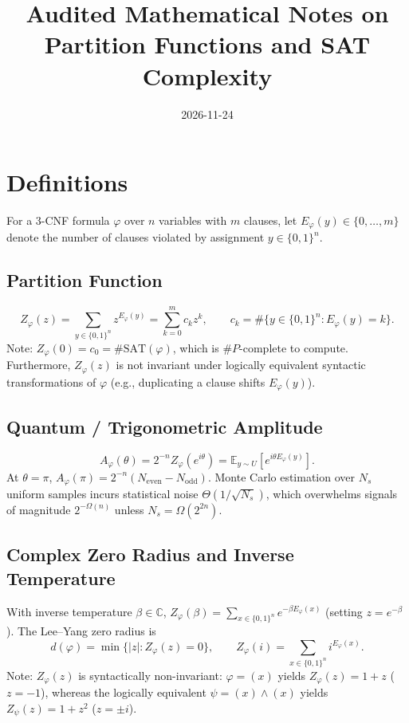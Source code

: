 \documentclass[11pt]{article}
\title{Audited Mathematical Notes on Partition Functions and SAT Complexity}
\date{2026-11-24}
\begin{document}
\maketitle

\section{Definitions}
For a 3-CNF formula $\varphi$ over $n$ variables with $m$ clauses, let $E_\varphi(y) \in \{0,\dots,m\}$ denote the number of clauses violated by assignment $y \in \{0,1\}^n$.

\subsection{Partition Function}
\begin{equation}
Z_\varphi(z) = \sum_{y \in \{0,1\}^n} z^{E_\varphi(y)} = \sum_{k=0}^{m} c_k z^k, \qquad c_k = \#\{y \in \{0,1\}^n : E_\varphi(y) = k\}.
\end{equation}
Note: $Z_\varphi(0) = c_0 = \#\mathrm{SAT}(\varphi)$, which is $\#P$-complete to compute. Furthermore, $Z_\varphi(z)$ is not invariant under logically equivalent syntactic transformations of $\varphi$ (e.g., duplicating a clause shifts $E_\varphi(y)$).

\subsection{Quantum / Trigonometric Amplitude}
\begin{equation}
A_\varphi(\theta) = 2^{-n} Z_\varphi(e^{i\theta}) = \mathbb{E}_{y \sim U}\!\left[e^{i\theta E_\varphi(y)}\right].
\end{equation}
At $\theta = \pi$, $A_\varphi(\pi) = 2^{-n}(N_{\mathrm{even}} - N_{\mathrm{odd}})$. Monte Carlo estimation over $N_s$ uniform samples incurs statistical noise $\Theta(1/\sqrt{N_s})$, which overwhelms signals of magnitude $2^{-\Omega(n)}$ unless $N_s = \Omega(2^{2n})$.

\subsection{Complex Zero Radius and Inverse Temperature}
With inverse temperature $\beta \in \mathbb{C}$, $Z_\varphi(\beta) = \sum_{x \in \{0,1\}^n} e^{-\beta E_\varphi(x)}$ (setting $z = e^{-\beta}$). The Lee--Yang zero radius is
\begin{equation}
d(\varphi) = \min \{ |z| : Z_\varphi(z) = 0 \}, \qquad Z_\varphi(i) = \sum_{x \in \{0,1\}^n} i^{E_\varphi(x)}.
\end{equation}
Note: $Z_\varphi(z)$ is syntactically non-invariant: $\varphi = (x)$ yields $Z_\varphi(z) = 1+z$ ($z = -1$), whereas the logically equivalent $\psi = (x) \land (x)$ yields $Z_\psi(z) = 1+z^2$ ($z = \pm i$).
\end{document}
